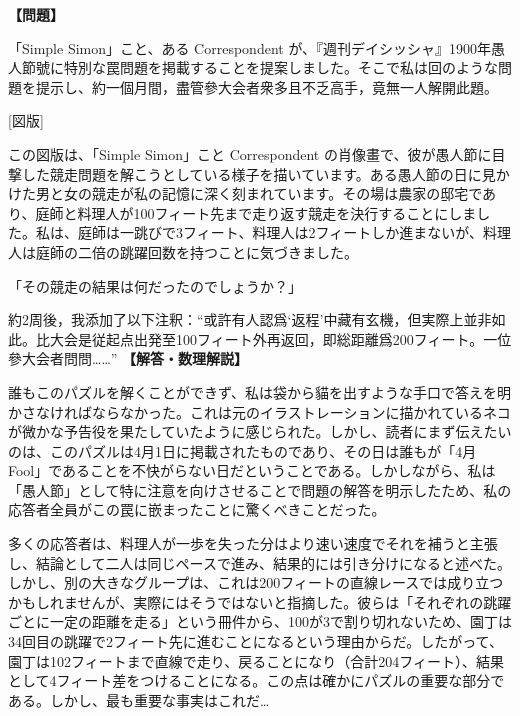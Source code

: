 \documentclass[10pt,a4paper,oneside,openany]{ltjsbook}
\begin{document}
\begin{tcolorbox}[colback=softblue,colframe=primaryblue,title=\textbf{第 428 問：園芸師と料理人 （原題: THE GARDENER AND THE COOK.）},arc=2mm,boxrule=1pt,breakable]
\textbf{【問題】}\par\vspace{0.3em}
「Simple Simon」こと、ある Correspondent が、『週刊デイシッシャ』1900年愚人節號に特別な罠問題を掲載することを提案しました。そこで私は回のような問題を提示し、約一個月間，盡管參大会者衆多且不乏高手，竟無一人解開此題。

[図版]

この図版は、「Simple Simon」こと Correspondent の肖像畫で、彼が愚人節に目撃した競走問題を解こうとしている様子を描いています。ある愚人節の日に見かけた男と女の競走が私の記憶に深く刻まれています。その場は農家の邸宅であり、庭師と料理人が100フィート先まで走り返す競走を決行することにしました。私は、庭師は一跳びで3フィート、料理人は2フィートしか進まないが、料理人は庭師の二倍の跳躍回数を持つことに気づきました。

「その競走の結果は何だったのでしょうか？」

約2周後，我添加了以下注釈：“或許有人認爲‘返程’中藏有玄機，但実際上並非如此。比大会是従起点出発至100フィート外再返回，即総距離爲200フィート。一位參大会者問問……”
\tcblower
\textbf{【解答・数理解説】}\par\vspace{0.3em}
誰もこのパズルを解くことができず、私は袋から貓を出すような手口で答えを明かさなければならなかった。これは元のイラストレーションに描かれているネコが微かな予告役を果たしていたように感じられた。しかし、読者にまず伝えたいのは、このパズルは4月1日に掲載されたものであり、その日は誰もが「4月 Fool」であることを不快がらない日だということである。しかしながら、私は「愚人節」として特に注意を向けさせることで問題の解答を明示したため、私の応答者全員がこの罠に嵌まったことに驚くべきことだった。

多くの応答者は、料理人が一歩を失った分はより速い速度でそれを補うと主張し、結論として二人は同じペースで進み、結果的には引き分けになると述べた。しかし、別の大きなグループは、これは200フィートの直線レースでは成り立つかもしれませんが、実際にはそうではないと指摘した。彼らは「それぞれの跳躍ごとに一定の距離を走る」という冊件から、100が3で割り切れないため、園丁は34回目の跳躍で2フィート先に進むことになるという理由からだ。したがって、園丁は102フィートまで直線で走り、戻ることになり（合計204フィート）、結果として4フィート差をつけることになる。この点は確かにパズルの重要な部分である。しかし、最も重要な事実はこれだ…
\end{tcolorbox}
\end{document}
